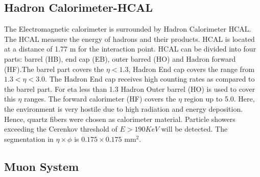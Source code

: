 \subsection{Hadron Calorimeter-HCAL}
The Electromagnetic calorimeter is surrounded by Hadron
Calorimeter HCAL. The HCAL measure the energy of hadrons and
their products. HCAL is located at a distance of 1.77 m for the
interaction point. HCAL can be divided into four parts: barrel
(HB), end cap (EB), outer barred (HO) and Hadron forward
(HF).The barrel part covers the $\eta < 1.3$, Hadron End cap
covers the range from $1.3 <\eta < 3.0$. The Hadron End cap
receives high counting rates as compared to the barrel part.
For eta less than 1.3 Hadron Outer barrel (HO) is used to cover
this $\eta$ ranges. The forward calorimeter (HF) covers the
$\eta$ region up to 5.0. Here, the environment is very hostile
due to high radiation and energy deposition. Hence, quartz
fibers were chosen as calorimeter material. Particle showers
exceeding the Cerenkov threshold of $E > 190 KeV$ will be
detected. The segmentation in $\eta\times\phi$ is $0.175\times
0.175$ mm$^{2}$.

\subsection{Muon System}

